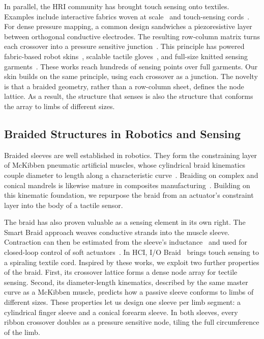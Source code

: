 \documentclass[letterpaper, 10 pt, conference]{ieeeconf}  %
\begin{document}
In parallel, the HRI community has brought touch sensing onto textiles. Examples include interactive fabrics woven at scale~\cite{jacquard} and touch-sensing cords~\cite{iobraid}. For dense pressure mapping, a common design sandwiches a piezoresistive layer between orthogonal conductive electrodes. The resulting row-column matrix turns each crossover into a pressure sensitive junction~\cite{holm}. This principle has powered fabric-based robot skins~\cite{buscher}, scalable tactile gloves~\cite{tactileglove}, and full-size knitted sensing garments~\cite{tactiletextiles,knits}. These works reach hundreds of sensing points over full garments. Our skin builds on the same principle, using each crossover as a junction. The novelty is that a braided geometry, rather than a row-column sheet, defines the node lattice. As a result, the structure that senses is also the structure that conforms the array to limbs of different sizes.

\subsection{Braided Structures in Robotics and Sensing}

Braided sleeves are well established in robotics. They form the constraining layer of McKibben pneumatic artificial muscles, whose cylindrical braid kinematics couple diameter to length along a characteristic curve~\cite{chou}. Braiding on complex and conical mandrels is likewise mature in composites manufacturing~\cite{braidreview}. Building on this kinematic foundation, we repurpose the braid from an actuator's constraint layer into the body of a tactile sensor.

The braid has also proven valuable as a sensing element in its own right. The Smart Braid approach weaves conductive strands into the muscle sleeve. Contraction can then be estimated from the sleeve's inductance~\cite{smartbraid} and used for closed-loop control of soft actuators~\cite{smartbraidfb}. In HCI, I/O Braid~\cite{iobraid} brings touch sensing to a spiraling textile cord. Inspired by these works, we exploit two further properties of the braid. First, its crossover lattice forms a dense node array for tectile sensing. Second, its diameter-length kinematics, described by the same master curve as a McKibben muscle, predicts how a passive sleeve conforms to limbs of different sizes. These properties let us design one sleeve per limb segment: a cylindrical finger sleeve and a conical forearm sleeve. In both sleeves, every ribbon crossover doubles as a pressure sensitive node, tiling the full circumference of the limb.
\end{document}
